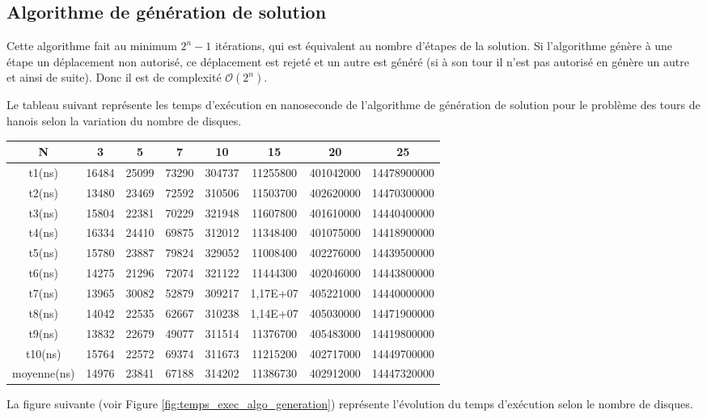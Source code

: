 \subsection{Algorithme de génération de solution}
Cette algorithme fait au minimum $2^{n} - 1$ itérations, qui est équivalent au nombre d'étapes de la solution. Si l'algorithme génère à une étape un déplacement non autorisé, ce déplacement est rejeté et un autre est généré (si à son tour il n'est pas autorisé en génère un autre et ainsi de suite). Donc il est de complexité $\mathcal{O}(2^{n})$.
\par
Le tableau suivant représente les temps d'exécution en nanoseconde de l'algorithme de génération de solution pour le problème des tours de hanois selon la variation du nombre de disques.\\
\small
\begin{center}
    \begin{tabular}{| c | c | c | c | c | c | c | c |}
        \hline
        N & 3 & 5 & 7 & 10 & 15 & 20 & 25\\
        \hline
        t1(ns) & 16484 & 25099 & 73290 & 304737 & 11255800 & 401042000 & 14478900000\\
        \hline
        t2(ns) & 13480 & 23469 & 72592 & 310506 & 11503700 & 402620000 & 14470300000\\
        \hline
        t3(ns) & 15804 & 22381 & 70229 & 321948 & 11607800 & 401610000 & 14440400000\\
        \hline
        t4(ns) & 16334 & 24410 & 69875 & 312012 & 11348400 & 401075000 & 14418900000\\
        \hline
        t5(ns) & 15780 & 23887 & 79824 & 329052 & 11008400 & 402276000 & 14439500000\\
        \hline
        t6(ns) & 14275 & 21296 & 72074 & 321122 & 11444300 & 402046000 & 14443800000\\
        \hline
        t7(ns) & 13965 & 30082 & 52879 & 309217 & 1,17E+07 & 405221000 & 14440000000\\
        \hline
        t8(ns) & 14042 & 22535 & 62667 & 310238 & 1,14E+07 & 405030000 & 14471900000\\
        \hline
        t9(ns) & 13832 & 22679 & 49077 & 311514 & 11376700 & 405483000 & 14419800000\\
        \hline
        t10(ns) & 15764 & 22572 & 69374 & 311673 & 11215200 & 402717000 & 14449700000\\
        \hline
        moyenne(ns) & 14976 & 23841 & 67188 & 314202 & 11386730 & 402912000 & 14447320000\\
        \hline
    \end{tabular}
\end{center}
\normalsize
\par
La figure suivante (voir Figure \ref{fig:temps_exec_algo_generation}) représente l'évolution du temps d'exécution selon le nombre de disques.

